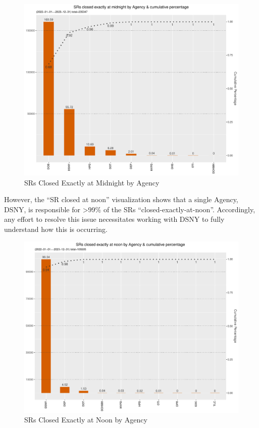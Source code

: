 \documentclass[12pt, titlepage]{article}
\begin{document}
{	\begin{figure}[tbp]
		\centering
		\includegraphics[width = \textwidth]{closed_at_midnight_chart.pdf}
		\caption{SRs Closed Exactly at Midnight by Agency}
		\label{fig:midnight-closed}
	\end{figure}	

	However, the ``SR closed at noon'' visualization shows that  a single Agency, DSNY,
	is responsible for \textgreater99\% of the SRs ``closed-exactly-at-noon''. Accordingly, any effort to resolve this issue
	necessitates working with DSNY to fully understand how this is occurring. 
	
	\begin{figure}[tbp]
		\centering
		\includegraphics[width = \textwidth]{closed_at_noon_chart.pdf}
		\caption{SRs Closed Exactly at Noon by Agency}
		\label{fig:noon-closed}
	\end{figure}	
	
}
\end{document}
